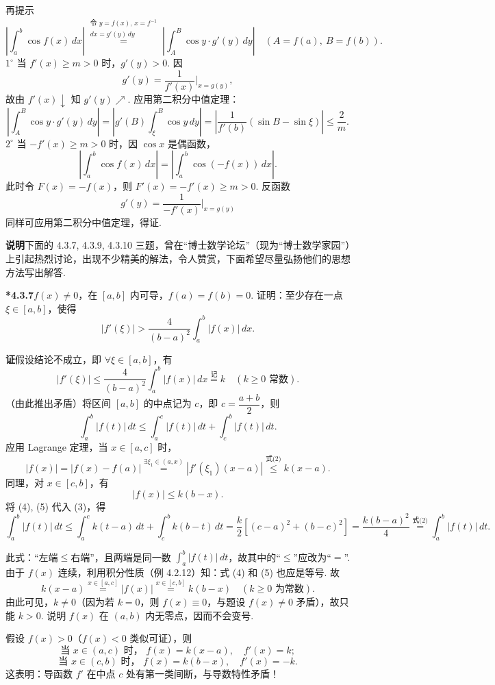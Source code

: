 \documentclass[UTF8, 12pt, fontset=fandol, oneside]{ctexart}
\begin{document}
再提示
\[
\left|\int_a^b\cos f(x)\,dx\right|
\stackrel{\substack{\text{令 }y=f(x),\,x=f^{-1}\\ dx=g'(y)\,dy}}{=}
\left|\int_A^B\cos y\cdot g'(y)\,dy\right|
\quad(A=f(a),\ B=f(b)).
\tag{1}
\]
$1^\circ$ 当 $f'(x)\ge m>0$ 时，$g'(y)>0$. 因
\[
g'(y)=\frac1{f'(x)}\bigg|_{x=g(y)},
\]
故由 $f'(x)\downarrow$ 知 $g'(y)\nearrow$. 应用第二积分中值定理：
\[
\left|\int_A^B\cos y\cdot g'(y)\,dy\right|
=\left|g'(B)\int_\xi^B\cos y\,dy\right|
=\left|\frac1{f'(b)}(\sin B-\sin\xi)\right|\le\frac2m.
\]
$2^\circ$ 当 $-f'(x)\ge m>0$ 时，因 $\cos x$ 是偶函数，
\[
\left|\int_a^b\cos f(x)\,dx\right|
=\left|\int_a^b\cos(-f(x))\,dx\right|.
\]
此时令 $F(x)=-f(x)$，则 $F'(x)=-f'(x)\ge m>0$. 反函数
\[
g'(y)=\frac1{-f'(x)}\bigg|_{x=g(y)}
\]
同样可应用第二积分中值定理，得证.

\noindent\textbf{说明}\quad 下面的 4.3.7, 4.3.9, 4.3.10 三题，曾在“博士数学论坛”（现为“博士数学家园”）上引起热烈讨论，出现不少精美的解法，令人赞赏，下面希望尽量弘扬他们的思想方法写出解答.

\noindent\textbf{*4.3.7}\quad $f(x)\ne0$，在 $[a,b]$ 内可导，$f(a)=f(b)=0$. 证明：至少存在一点 $\xi\in[a,b]$，使得
\[
|f'(\xi)|>\frac4{(b-a)^2}\int_a^b|f(x)|\,dx.
\tag{1}
\]

\noindent\textbf{证}\quad 假设结论不成立，即 $\forall\xi\in[a,b]$，有
\[
|f'(\xi)|\le\frac4{(b-a)^2}\int_a^b|f(x)|\,dx\stackrel{\text{记}}{=}k
\quad(k\ge0\text{ 常数}).
\tag{2}
\]
（由此推出矛盾）将区间 $[a,b]$ 的中点记为 $c$，即 $c=\dfrac{a+b}2$，则
\[
\int_a^b|f(t)|\,dt\le\int_a^c|f(t)|\,dt+\int_c^b|f(t)|\,dt.
\tag{3}
\]
应用 Lagrange 定理，当 $x\in[a,c]$ 时，
\[
|f(x)|=|f(x)-f(a)|
\stackrel{\exists\xi_1\in(a,x)}{=}|f'(\xi_1)(x-a)|
\stackrel{\text{式(2)}}{\le}k(x-a).
\tag{4}
\]
同理，对 $x\in[c,b]$，有
\[
|f(x)|\le k(b-x).
\tag{5}
\]
将 (4), (5) 代入 (3)，得
\[
\int_a^b|f(t)|\,dt
\le\int_a^c k(t-a)\,dt+\int_c^b k(b-t)\,dt
=\frac k2\left[(c-a)^2+(b-c)^2\right]
=\frac{k(b-a)^2}{4}
\stackrel{\text{式(2)}}{=}\int_a^b|f(t)|\,dt.
\tag{6}
\]

此式：“左端$\le$右端”，且两端是同一数 $\displaystyle\int_a^b|f(t)|\,dt$，故其中的“$\le$”应改为“$=$”. 由于 $f(x)$ 连续，利用积分性质（例 4.2.12）知：式 (4) 和 (5) 也应是等号. 故
\[
k(x-a)\stackrel{x\in[a,c]}{=}|f(x)|\stackrel{x\in[c,b]}{=}k(b-x)
\quad(k\ge0\text{ 为常数}).
\tag{7}
\]
由此可见，$k\ne0$（因为若 $k=0$，则 $f(x)\equiv0$，与题设 $f(x)\ne0$ 矛盾），故只能 $k>0$. 说明 $f(x)$ 在 $(a,b)$ 内无零点，因而不会变号.

假设 $f(x)>0$（$f(x)<0$ 类似可证），则
\[
\text{当 }x\in(a,c)\text{ 时， }f(x)=k(x-a),\quad f'(x)=k;
\]
\[
\text{当 }x\in(c,b)\text{ 时， }f(x)=k(b-x),\quad f'(x)=-k.
\]
这表明：导函数 $f'$ 在中点 $c$ 处有第一类间断，与导数特性矛盾！
\end{document}
